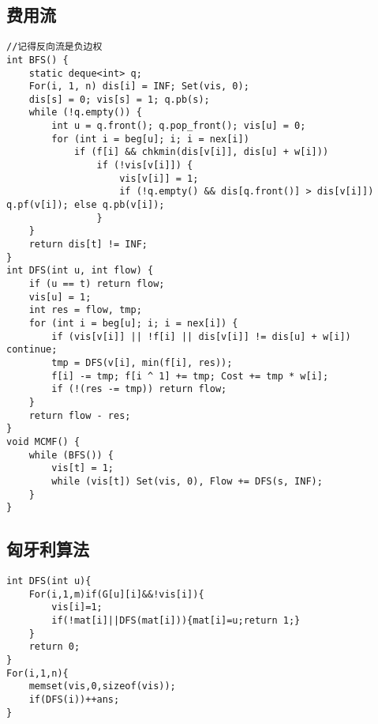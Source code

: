 \documentclass[twocolumn,a4]{article}
\begin{document}
\subsection{费用流}
\begin{lstlisting}
//记得反向流是负边权
int BFS() {
    static deque<int> q;
    For(i, 1, n) dis[i] = INF; Set(vis, 0);
    dis[s] = 0; vis[s] = 1; q.pb(s);
    while (!q.empty()) {
        int u = q.front(); q.pop_front(); vis[u] = 0;
        for (int i = beg[u]; i; i = nex[i])
            if (f[i] && chkmin(dis[v[i]], dis[u] + w[i]))
                if (!vis[v[i]]) {
                    vis[v[i]] = 1;
                    if (!q.empty() && dis[q.front()] > dis[v[i]]) q.pf(v[i]); else q.pb(v[i]);
                }
    }
    return dis[t] != INF;
}
int DFS(int u, int flow) {
    if (u == t) return flow;
    vis[u] = 1;
    int res = flow, tmp;
    for (int i = beg[u]; i; i = nex[i]) {
        if (vis[v[i]] || !f[i] || dis[v[i]] != dis[u] + w[i]) continue;
        tmp = DFS(v[i], min(f[i], res));
        f[i] -= tmp; f[i ^ 1] += tmp; Cost += tmp * w[i];
        if (!(res -= tmp)) return flow;
    }
    return flow - res;
}
void MCMF() {
    while (BFS()) {
        vis[t] = 1;
        while (vis[t]) Set(vis, 0), Flow += DFS(s, INF);
    }
}
\end{lstlisting}
\subsection{匈牙利算法}
\begin{lstlisting}
int DFS(int u){
	For(i,1,m)if(G[u][i]&&!vis[i]){
		vis[i]=1;
		if(!mat[i]||DFS(mat[i])){mat[i]=u;return 1;}
	}
	return 0;
}
For(i,1,n){
	memset(vis,0,sizeof(vis));
	if(DFS(i))++ans;
}
\end{lstlisting}
\end{document}

